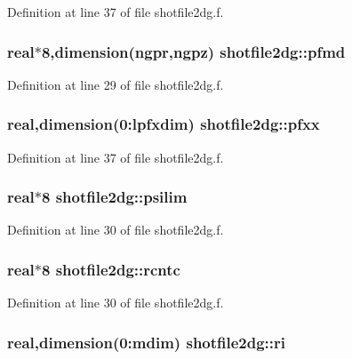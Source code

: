 Definition at line 37 of file shotfile2dg.f.\hypertarget{namespaceshotfile2dg_244c205e85803307a067220a9149a277}{
\subsubsection[pfmd]{\setlength{\rightskip}{0pt plus 5cm}real$\ast$8,dimension(ngpr,ngpz) {\bf shotfile2dg::pfmd}}}
\label{namespaceshotfile2dg_244c205e85803307a067220a9149a277}




Definition at line 29 of file shotfile2dg.f.\hypertarget{namespaceshotfile2dg_331286c491d6a04e169e34eb2773ebfb}{
\subsubsection[pfxx]{\setlength{\rightskip}{0pt plus 5cm}real,dimension(0:{\bf lpfxdim}) {\bf shotfile2dg::pfxx}}}
\label{namespaceshotfile2dg_331286c491d6a04e169e34eb2773ebfb}




Definition at line 37 of file shotfile2dg.f.\hypertarget{namespaceshotfile2dg_3d5fc7ba6a17fbbe538f7c4d2b3138cc}{
\subsubsection[psilim]{\setlength{\rightskip}{0pt plus 5cm}real$\ast$8 {\bf shotfile2dg::psilim}}}
\label{namespaceshotfile2dg_3d5fc7ba6a17fbbe538f7c4d2b3138cc}




Definition at line 30 of file shotfile2dg.f.\hypertarget{namespaceshotfile2dg_519caa04c862ac70905e9cb264d156b0}{
\subsubsection[rcntc]{\setlength{\rightskip}{0pt plus 5cm}real$\ast$8 {\bf shotfile2dg::rcntc}}}
\label{namespaceshotfile2dg_519caa04c862ac70905e9cb264d156b0}




Definition at line 30 of file shotfile2dg.f.\hypertarget{namespaceshotfile2dg_4b7dcff54fb43627b08f2afdb56abffd}{
\subsubsection[ri]{\setlength{\rightskip}{0pt plus 5cm}real,dimension(0:{\bf mdim}) {\bf shotfile2dg::ri}}}
\label{namespaceshotfile2dg_4b7dcff54fb43627b08f2afdb56abffd}




